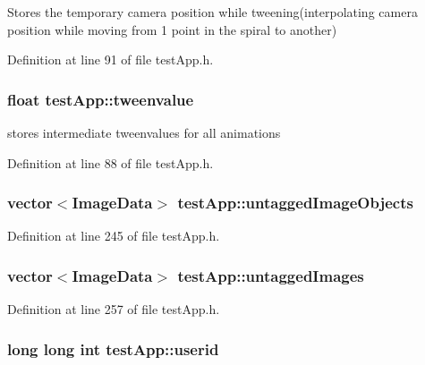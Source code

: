 Stores the temporary camera position while tweening(interpolating camera position while moving from 1 point in the spiral to another) 



Definition at line 91 of file test\-App.\-h.

\hypertarget{classtest_app_add9ab1aa902948afbdf1c6db0dfde385}{
\subsubsection[{tweenvalue}]{\setlength{\rightskip}{0pt plus 5cm}float test\-App\-::tweenvalue}}\label{classtest_app_add9ab1aa902948afbdf1c6db0dfde385}


stores intermediate tweenvalues for all animations 



Definition at line 88 of file test\-App.\-h.

\hypertarget{classtest_app_ae31cc868f554f62b4c6e4e9db3b4155b}{
\subsubsection[{untagged\-Image\-Objects}]{\setlength{\rightskip}{0pt plus 5cm}vector$<${\bf Image\-Data}$>$ test\-App\-::untagged\-Image\-Objects}}\label{classtest_app_ae31cc868f554f62b4c6e4e9db3b4155b}


Definition at line 245 of file test\-App.\-h.

\hypertarget{classtest_app_a9cb9aa0700c4c8b316329a86c4e650ec}{
\subsubsection[{untagged\-Images}]{\setlength{\rightskip}{0pt plus 5cm}vector$<${\bf Image\-Data}$>$ test\-App\-::untagged\-Images}}\label{classtest_app_a9cb9aa0700c4c8b316329a86c4e650ec}


Definition at line 257 of file test\-App.\-h.

\hypertarget{classtest_app_a6ae76dc97fbeee00755f4a6cd6b87e19}{
\subsubsection[{userid}]{\setlength{\rightskip}{0pt plus 5cm}long long int test\-App\-::userid}}\label{classtest_app_a6ae76dc97fbeee00755f4a6cd6b87e19}


